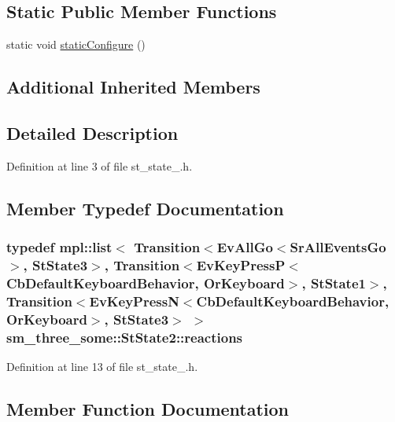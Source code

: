 \subsection*{Static Public Member Functions}
\begin{DoxyCompactItemize}
\item 
static void \hyperlink{structsm__three__some_1_1StState2_af07ae40962e343ce9605288f0ebad82b}{static\+Configure} ()
\end{DoxyCompactItemize}
\subsection*{Additional Inherited Members}


\subsection{Detailed Description}


Definition at line 3 of file st\+\_\+state\+\_.\+h.



\subsection{Member Typedef Documentation}
\subsubsection[{\texorpdfstring{reactions}{reactions}}]{\setlength{\rightskip}{0pt plus 5cm}typedef mpl\+::list$<$ Transition$<$Ev\+All\+Go$<$Sr\+All\+Events\+Go$>$, {\bf St\+State3}$>$, Transition$<$Ev\+Key\+PressP$<$Cb\+Default\+Keyboard\+Behavior, {\bf Or\+Keyboard}$>$, {\bf St\+State1}$>$, Transition$<$Ev\+Key\+PressN$<$Cb\+Default\+Keyboard\+Behavior, {\bf Or\+Keyboard}$>$, {\bf St\+State3}$>$ $>$ {\bf sm\+\_\+three\+\_\+some\+::\+St\+State2\+::reactions}}\hypertarget{structsm__three__some_1_1StState2_ab4fa2f190482199ca04dd3aff5b90119}{}\label{structsm__three__some_1_1StState2_ab4fa2f190482199ca04dd3aff5b90119}


Definition at line 13 of file st\+\_\+state\+\_.\+h.



\subsection{Member Function Documentation}
